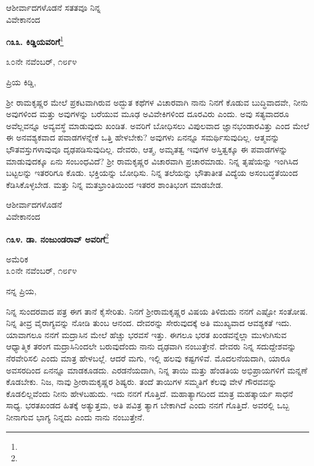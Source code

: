 {\flushright
ಆಶೀರ್ವಾದಗಳೊಡನೆ ಸತತವೂ ನಿನ್ನ\\ವಿವೇಕಾನಂದ\par}

\begin{center}
\textbf{೧೩೩. ಕಿಡ್ಡಿಯವರಿಗೆ}\footnote{}
\end{center}

\begin{flushright}
೩೦ನೇ ನವೆಂಬರ್, ೧೮೯೪
\end{flushright}

\noindent
ಪ್ರಿಯ ಕಿಡ್ಡಿ,

ಶ‍್ರೀ ರಾಮಕೃಷ್ಣರ ಮೇಲೆ ಪ್ರಕಟವಾಗಿರುವ ಅದ್ಭುತ ಕಥೆಗಳ ವಿಚಾರವಾಗಿ ನಾನು ನಿನಗೆ ಕೊಡುವ ಬುದ್ಧಿವಾದವೇ, ನೀನು ಅವುಗಳಿಂದ ಮತ್ತು ಅವುಗಳನ್ನು ಬರೆಯುವ ಮೂಢ ಅವಿವೇಕಿಗಳಿಂದ ದೂರವಿರು ಎಂದು. ಅವು ಸತ್ಯವಾದರೂ ಅವೆಲ್ಲವನ್ನೂ ಅವ್ಯವಸ್ಥೆ ಮಾಡುವುದು ಖಂಡಿತ. ಅವರಿಗೆ ಬೋಧಿಸಲು ವಿಪುಲವಾದ ಜ್ಞಾನಭಂಡಾರವಿತ್ತು ಎಂದ ಮೇಲೆ ಈ ಅನವಶ್ಯಕವಾದ ಪವಾಡಗಳನ್ನೇಕೆ ಒತ್ತಿ ಹೇಳಬೇಕು? ಅವುಗಳು ಏನನ್ನೂ ಸಮರ್ಥಿಸುವುದಿಲ್ಲ. ಆತ್ಮವನ್ನು ಭೌತವಸ್ತುಗಳಾವುವೂ ದೃಢಪಡಿಸುವುದಿಲ್ಲ. ದೇವರು, ಆತ್ಮ, ಅಮೃತತ್ವ ಇವುಗಳ ಅಸ್ತಿತ್ವಕ್ಕೂ ಈ ಪವಾಡಗಳನ್ನು ಮಾಡುವುದಕ್ಕೂ ಏನು ಸಂಬಂಧವಿದೆ? ಶ‍್ರೀ ರಾಮಕೃಷ್ಣರ ವಿಚಾರವಾಗಿ ಪ್ರಚಾರಮಾಡು. ನಿನ್ನ ತೃಷೆಯನ್ನು ಇಂಗಿಸಿದ ಬಟ್ಟಲನ್ನು ಇತರರಿಗೂ ಕೊಡು. ಭಕ್ತಿಯನ್ನು ಬೋಧಿಸು. ನಿನ್ನ ತಲೆಯನ್ನು ಭೌತಾತೀತ ವಿದ್ಯೆಯ ಅಸಂಬದ್ಧತೆಯಿಂದ ಕೆಡಿಸಿಕೊಳ್ಳಬೇಡ. ಮತ್ತು ನಿನ್ನ ಮತಭ್ರಾಂತಿಯಿಂದ ಇತರರ ಶಾಂತಿಭಂಗ ಮಾಡಬೇಡ.

{\flushright
ಆಶೀರ್ವಾದಗಳೊಡನೆ\\ವಿವೇಕಾನಂದ\par}

\begin{center}
\textbf{೧೩೪. ಡಾ. ನಂಜುಂಡರಾವ್ ಅವರಿಗೆ}\footnote{}
\end{center}

\begin{flushright}
ಅಮೆರಿಕ\\೩೦ನೇ ನವೆಂಬರ್, ೧೮೯೪
\end{flushright}

\noindent
ನನ್ನ ಪ್ರಿಯ,

ನಿನ್ನ ಸುಂದರವಾದ ಪತ್ರ ಈಗ ತಾನೆ ಕೈಸೇರಿತು. ನಿನಗೆ ಶ‍್ರೀರಾಮಕೃಷ್ಣರ ವಿಷಯ ತಿಳಿದುದು ನನಗೆ ಎಷ್ಟೋ ಸಂತೋಷ. ನಿನ್ನ ತೀವ್ರ ವೈರಾಗ್ಯವನ್ನು ನೋಡಿ ತುಂಬ ಆನಂದ. ದೇವರನ್ನು ಸೇರುವುದಕ್ಕೆ ಅತಿ ಮುಖ್ಯವಾದ ಆವಶ್ಯಕತೆ ಇದು. ಯಾವಾಗಲೂ ನನಗೆ ಮದ್ರಾಸಿನ ಮೇಲೆ ಹೆಚ್ಚು ಭರವಸೆ ಇತ್ತು. ಈಗಲೂ ಭರತ ಖಂಡವನ್ನೆಲ್ಲಾ ಮುಳುಗಿಸುವ ಆಧ್ಯಾತ್ಮಿಕ ತರಂಗ ಮದ್ರಾಸಿನಿಂದಲೇ ಬರುವುದೆಂದು ನಾನು ದೃಢವಾಗಿ ನಂಬುತ್ತೇನೆ. ದೇವರು ನಿನ್ನ ಸದುದ್ದೇಶವನ್ನು ನೆರವೇರಿಸಲಿ ಎಂದು ಮಾತ್ರ ಹೇಳಬಲ್ಲೆ. ಆದರೆ ಮಗು, ಇಲ್ಲಿ ಹಲವು ಕಷ್ಟಗಳಿವೆ. ಮೊದಲನೆಯದಾಗಿ, ಯಾರೂ ಅವಸರದಿಂದ ಏನನ್ನೂ ಮಾಡಕೂಡದು. ಎರಡನೆಯದಾಗಿ, ನಿನ್ನ ತಾಯಿ ಮತ್ತು ಹೆಂಡತಿಯ ಅಭಿಪ್ರಾಯಗಳಿಗೆ ಮನ್ನಣೆ ಕೊಡಬೇಕು. ನಿಜ, ನಾವು ಶ‍್ರೀರಾಮಕೃಷ್ಣರ ಶಿಷ್ಯರು. ತಂದೆ ತಾಯಿಗಳ ಸಮ್ಮತಿಗೆ ಕೆಲವು ವೇಳೆ ಗೌರವವನ್ನು ಕೊಡಲಿಲ್ಲವೆಂದು ನೀನು ಹೇಳಬಹುದು. ಇದು ನನಗೆ ಗೊತ್ತಿದೆ. ಮಹಾತ್ಯಾಗದಿಂದ ಮಾತ್ರ ಮಹತ್ಕಾರ್ಯ ಸಾಧನೆ ಸಾಧ್ಯ. ಭರತಖಂಡದ ಹಿತಕ್ಕೆ ಅತ್ಯುತ್ತಮ, ಅತಿ ಪವಿತ್ರ ತ್ಯಾಗ ಬೇಕಾಗಿದೆ ಎಂದು ನನಗೆ ಗೊತ್ತಿದೆ. ಅವರಲ್ಲಿ ಒಬ್ಬ ನೀನಾಗುವ ಭಾಗ್ಯ ನಿನ್ನದು ಎಂದು ನಾನು ನಂಬುತ್ತೇನೆ.

